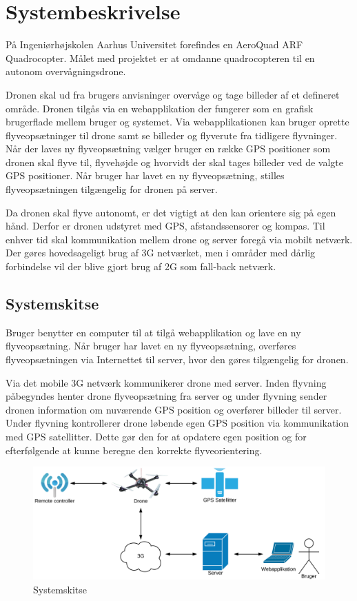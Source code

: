 \chapter{Systembeskrivelse}
\vspace{-1cm}
På Ingeniørhøjskolen Aarhus Universitet forefindes en AeroQuad ARF Quadrocopter. 
Målet med projektet er at omdanne quadrocopteren til en autonom overvågningsdrone.

Dronen skal ud fra brugers anvisninger overvåge og tage billeder af et defineret område. 
Dronen tilgås via en webapplikation der fungerer som en grafisk brugerflade mellem bruger og systemet.  Via webapplikationen kan bruger oprette flyveopsætninger til drone samt se billeder og flyverute fra tidligere flyvninger.  
Når der laves ny flyveopsætning vælger bruger en række GPS positioner som dronen skal flyve til, flyvehøjde og hvorvidt der skal tages billeder ved de valgte GPS positioner. Når bruger har lavet en ny flyveopsætning, stilles flyveopsætningen tilgængelig for dronen på server.  

Da dronen skal flyve autonomt, er det vigtigt at den kan orientere sig på egen hånd. Derfor er dronen udstyret med GPS, afstandssensorer og kompas.
Til enhver tid skal kommunikation mellem drone og server foregå via mobilt netværk. Der gøres hovedsageligt brug af 3G netværket, men i områder med dårlig forbindelse vil der blive gjort brug af 2G som fall-back netværk. 

\vspace{-0.5cm}

\section*{Systemskitse}
\vspace{-0.5cm}
Bruger benytter en computer til at tilgå webapplikation og lave en ny flyveopsætning. Når bruger har lavet en ny flyveopsætning, overføres flyveopsætningen via Internettet til server, hvor den gøres tilgængelig for dronen.
 
Via det mobile 3G netværk kommunikerer drone med server. 
Inden flyvning påbegyndes henter drone flyveopsætning fra server og under flyvning sender dronen information om nuværende GPS position og overfører billeder til server. 
Under flyvning kontrollerer drone løbende egen GPS position via kommunikation med GPS satellitter. Dette gør den for at opdatere egen position og for efterfølgende at kunne beregne den korrekte flyveorientering. 



\vspace{-5pt}
\begin{figure}[H]
\centering
\includegraphics[width=1\textwidth]{Billeder/Projektbeskrivelse.png}
\vspace{-.5cm}
\caption{Systemskitse}
\label{fig:Systemskitse}
\end{figure}